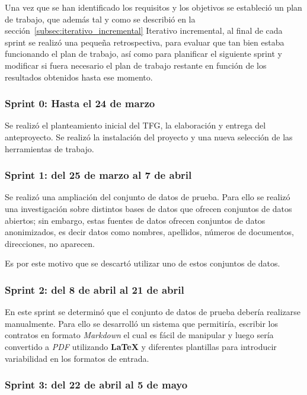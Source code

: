 Una vez que se han identificado los requisitos y los objetivos se estableció un plan de trabajo, que además tal y como
se describió en la sección~\ref{subsec:iterativo_incremental} Iterativo incremental, al final de cada sprint se realizó
una pequeña retrospectiva, para evaluar que tan bien estaba funcionando el plan de trabajo, así como para planificar
el siguiente sprint y modificar si fuera necesario el plan de trabajo restante en función de los resultados obtenidos
hasta ese momento.

\subsubsection{Sprint 0: Hasta el 24 de marzo}

Se realizó el planteamiento inicial del TFG, la elaboración y entrega del anteproyecto.
Se realizó la instalación del proyecto y una nueva selección de las herramientas de trabajo.

\subsubsection{Sprint 1: del 25 de marzo al 7 de abril}

Se realizó una ampliación del conjunto de datos de prueba.
Para ello se realizó una investigación sobre distintos bases de datos que ofrecen conjuntos de datos abiertos; sin
embargo, estas fuentes de datos ofrecen conjuntos de datos anonimizados, es decir datos como nombres, apellidos,
números de documentos, direcciones, no aparecen.

Es por este motivo que se descartó utilizar uno de estos conjuntos de datos.

\subsubsection{Sprint 2: del 8 de abril al 21 de abril}

En este sprint se determinó que el conjunto de datos de prueba debería realizarse manualmente.
Para ello se desarrolló un sistema que permitiría, escribir los contratos en formato \textit{Markdown} el cual es fácil
de manipular y luego sería convertido a \textit{PDF} utilizando \textbf{LaTeX} y diferentes plantillas para introducir
variabilidad en los formatos de entrada.

\subsubsection{Sprint 3: del 22 de abril al 5 de mayo}

